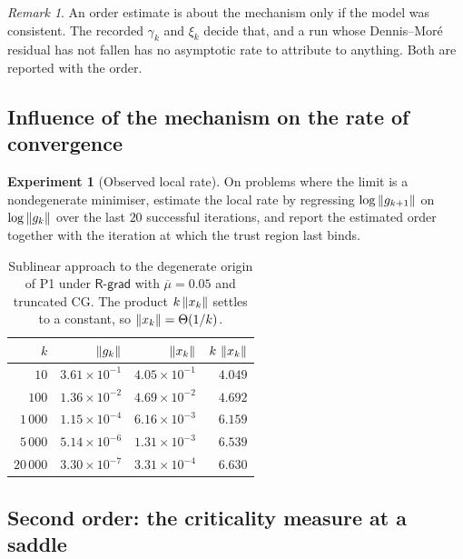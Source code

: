\documentclass[11pt]{article}
\theoremstyle{plain}
\theoremstyle{definition}
\newtheorem{experiment}{Experiment}
\theoremstyle{remark}
\newtheorem{remark}[theorem]{Remark}
\numberwithin{equation}{section}
\newcommand{\Rgrad}{\textsf{R-grad}}
\begin{document}
\begin{remark}
An order estimate is about the mechanism only if the model was consistent. The
recorded $\gamma_k$ and $\xi_k$ decide that, and a run whose Dennis--Mor\'e
residual has not fallen has no asymptotic rate to attribute to anything. Both are
reported with the order.
\end{remark}


\subsection{Influence of the mechanism on the rate of convergence}
\label{sec: exp rate}

\begin{experiment}[Observed local rate]
\label{exp: rate}
On problems where the limit is a nondegenerate minimiser, estimate the local rate by regressing
$\log\left \lVert g_{k+1} \right \rVert$ on $\log\left \lVert g_k \right \rVert$ over the last $20$ successful iterations, and report
the estimated order together with the iteration at which the trust region last binds.
\end{experiment}
\begin{table}[htbp]
  \centering
  \caption{Sublinear approach to the degenerate origin of P1 under $\Rgrad$ with
           $\overline{\mu} = 0.05$ and truncated CG. The product $k\left \lVert x_k \right \rVert$ settles to a
           constant, so $\left \lVert x_k \right \rVert = \Theta(1/k)$.}
  \label{tab: crawl}
  \small
  \begin{tabular}{rrrr}
    \toprule
    $k$ & $\left \lVert g_k \right \rVert$ & $\left \lVert x_k \right \rVert$ & $k\,\left \lVert x_k \right \rVert$ \\
    \midrule
    $10$      & $3.61\times10^{-1}$ & $4.05\times10^{-1}$ & $4.049$ \\
    $100$     & $1.36\times10^{-2}$ & $4.69\times10^{-2}$ & $4.692$ \\
    $1\,000$  & $1.15\times10^{-4}$ & $6.16\times10^{-3}$ & $6.159$ \\
    $5\,000$  & $5.14\times10^{-6}$ & $1.31\times10^{-3}$ & $6.539$ \\
    $20\,000$ & $3.30\times10^{-7}$ & $3.31\times10^{-4}$ & $6.630$ \\
    \bottomrule
  \end{tabular}
\end{table}

\subsection{Second order: the criticality measure at a saddle}
\label{sec: res second order}
\end{document}
